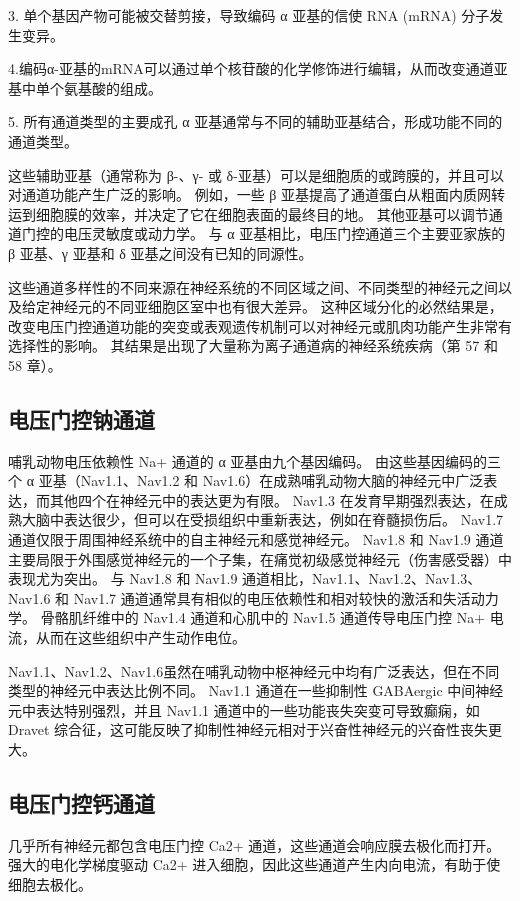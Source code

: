3. 单个基因产物可能被交替剪接，导致编码 α 亚基的信使 RNA (mRNA) 分子发生变异。 

4.编码α-亚基的mRNA可以通过单个核苷酸的化学修饰进行编辑，从而改变通道亚基中单个氨基酸的组成。 

5. 所有通道类型的主要成孔 α 亚基通常与不同的辅助亚基结合，形成功能不同的通道类型。

这些辅助亚基（通常称为 β-、γ- 或 δ-亚基）可以是细胞质的或跨膜的，并且可以对通道功能产生广泛的影响。 例如，一些 β 亚基提高了通道蛋白从粗面内质网转运到细胞膜的效率，并决定了它在细胞表面的最终目的地。 其他亚基可以调节通道门控的电压灵敏度或动力学。 与 α 亚基相比，电压门控通道三个主要亚家族的 β 亚基、γ 亚基和 δ 亚基之间没有已知的同源性。

这些通道多样性的不同来源在神经系统的不同区域之间、不同类型的神经元之间以及给定神经元的不同亚细胞区室中也有很大差异。 这种区域分化的必然结果是，改变电压门控通道功能的突变或表观遗传机制可以对神经元或肌肉功能产生非常有选择性的影响。 其结果是出现了大量称为离子通道病的神经系统疾病（第 57 和 58 章）。

\subsection{电压门控钠通道}
哺乳动物电压依赖性 Na+ 通道的 α 亚基由九个基因编码。 由这些基因编码的三个 α 亚基（Nav1.1、Nav1.2 和 Nav1.6）在成熟哺乳动物大脑的神经元中广泛表达，而其他四个在神经元中的表达更为有限。 Nav1.3 在发育早期强烈表达，在成熟大脑中表达很少，但可以在受损组织中重新表达，例如在脊髓损伤后。 Nav1.7 通道仅限于周围神经系统中的自主神经元和感觉神经元。 Nav1.8 和 Nav1.9 通道主要局限于外围感觉神经元的一个子集，在痛觉初级感觉神经元（伤害感受器）中表现尤为突出。 与 Nav1.8 和 Nav1.9 通道相比，Nav1.1、Nav1.2、Nav1.3、Nav1.6 和 Nav1.7 通道通常具有相似的电压依赖性和相对较快的激活和失活动力学。 骨骼肌纤维中的 Nav1.4 通道和心肌中的 Nav1.5 通道传导电压门控 Na+ 电流，从而在这些组织中产生动作电位。

Nav1.1、Nav1.2、Nav1.6虽然在哺乳动物中枢神经元中均有广泛表达，但在不同类型的神经元中表达比例不同。 Nav1.1 通道在一些抑制性 GABAergic 中间神经元中表达特别强烈，并且 Nav1.1 通道中的一些功能丧失突变可导致癫痫，如 Dravet 综合征，这可能反映了抑制性神经元相对于兴奋性神经元的兴奋性丧失更大。

\subsection{电压门控钙通道}
几乎所有神经元都包含电压门控 Ca2+ 通道，这些通道会响应膜去极化而打开。 强大的电化学梯度驱动 Ca2+ 进入细胞，因此这些通道产生内向电流，有助于使细胞去极化。

